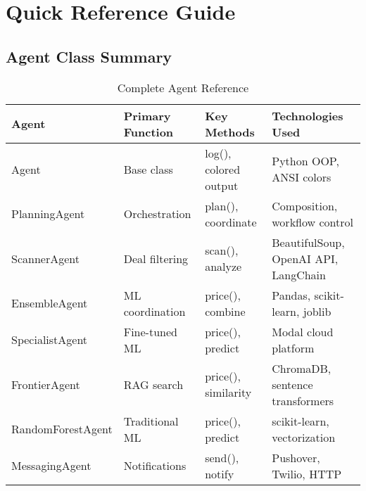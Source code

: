\documentclass[12pt,twoside,openright]{book}
\begin{document}
\mainmatter
















\appendix

\chapter{Quick Reference Guide}

\section{Agent Class Summary}

\begin{table}[htbp]
\centering
\small
\begin{tabular}{@{}p{2.5cm}p{3cm}p{3cm}p{6cm}@{}}
\toprule
\textbf{Agent} & \textbf{Primary Function} & \textbf{Key Methods} & \textbf{Technologies Used} \\
\midrule
Agent & Base class & log(), colored output & Python OOP, ANSI colors \\
PlanningAgent & Orchestration & plan(), coordinate & Composition, workflow control \\
ScannerAgent & Deal filtering & scan(), analyze & BeautifulSoup, OpenAI API, LangChain \\
EnsembleAgent & ML coordination & price(), combine & Pandas, scikit-learn, joblib \\
SpecialistAgent & Fine-tuned ML & price(), predict & Modal cloud platform \\
FrontierAgent & RAG search & price(), similarity & ChromaDB, sentence transformers \\
RandomForestAgent & Traditional ML & price(), predict & scikit-learn, vectorization \\
MessagingAgent & Notifications & send(), notify & Pushover, Twilio, HTTP \\
\bottomrule
\end{tabular}
\caption{Complete Agent Reference}
\end{table}
\end{document}
